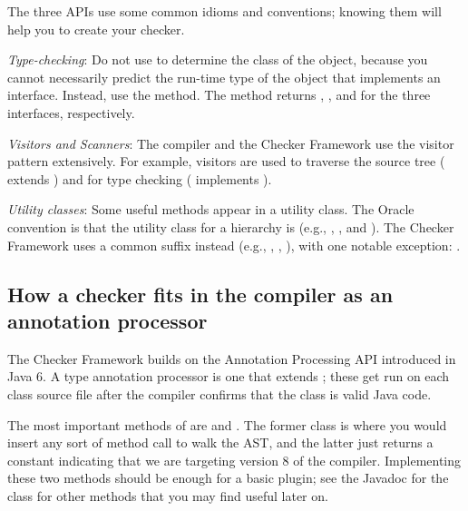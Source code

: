 The three APIs use some common idioms and conventions; knowing them will
help you to create your checker.

\emph{Type-checking}:
Do not use  to determine the class of the object,
because you cannot necessarily predict the run-time type of the object that
implements an interface.  Instead, use the  method.  The
method returns ,
, and 
for the three interfaces, respectively.

\emph{Visitors and Scanners}:
The compiler and the Checker Framework use the visitor pattern
extensively. For example, visitors are used to traverse the source tree
( extends
) and for type
checking ( implements
).

\emph{Utility classes}:
Some useful methods appear in a utility class.  The Oracle convention is that
the utility class for a  hierarchy is  (e.g.,
, , and
).  The Checker Framework uses a common
 suffix instead (e.g., ,
, ), with one
notable exception: .


\subsection{How a checker fits in the compiler as an annotation processor\label{checker-as-annotation-processor}}

The Checker Framework builds on the Annotation Processing API
introduced in Java 6.  A type annotation processor is one that extends
; these get run on each class
source file after the compiler confirms that the class is valid Java code.

The most important methods of 
are  and . The former
class is where you would insert any sort of method call to walk the AST\@,
and the latter just returns a constant indicating that we are targeting
version 8 of the compiler. Implementing these two methods should be enough
for a basic plugin; see the Javadoc for the class for other methods that
you may find useful later on.

